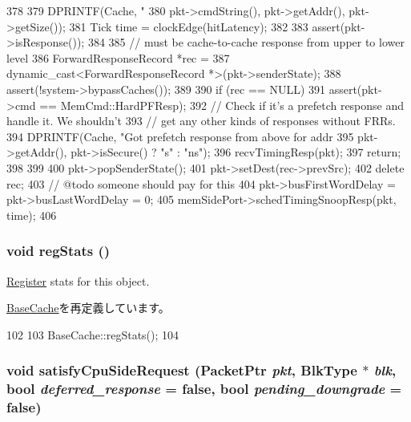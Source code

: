 \begin{DoxyCode}
378 {
379     DPRINTF(Cache, "%
380             pkt->cmdString(), pkt->getAddr(), pkt->getSize());
381     Tick time = clockEdge(hitLatency);
382 
383     assert(pkt->isResponse());
384 
385     // must be cache-to-cache response from upper to lower level
386     ForwardResponseRecord *rec =
387         dynamic_cast<ForwardResponseRecord *>(pkt->senderState);
388     assert(!system->bypassCaches());
389 
390     if (rec == NULL) {
391         assert(pkt->cmd == MemCmd::HardPFResp);
392         // Check if it's a prefetch response and handle it. We shouldn't
393         // get any other kinds of responses without FRRs.
394         DPRINTF(Cache, "Got prefetch response from above for addr %
395                 pkt->getAddr(), pkt->isSecure() ? "s" : "ns");
396         recvTimingResp(pkt);
397         return;
398     }
399 
400     pkt->popSenderState();
401     pkt->setDest(rec->prevSrc);
402     delete rec;
403     // @todo someone should pay for this
404     pkt->busFirstWordDelay = pkt->busLastWordDelay = 0;
405     memSidePort->schedTimingSnoopResp(pkt, time);
406 }
\end{DoxyCode}
\hypertarget{classCache_a4dc637449366fcdfc4e764cdf12d9b11}{
\subsubsection[{regStats}]{\setlength{\rightskip}{0pt plus 5cm}void regStats ()}}
\label{classCache_a4dc637449366fcdfc4e764cdf12d9b11}
\hyperlink{classRegister}{Register} stats for this object. 

\hyperlink{classBaseCache_a4dc637449366fcdfc4e764cdf12d9b11}{BaseCache}を再定義しています。


\begin{DoxyCode}
102 {
103     BaseCache::regStats();
104 }
\end{DoxyCode}
\hypertarget{classCache_a5d5d5944479d29a7bfc183f4b2b6a4fa}{
\subsubsection[{satisfyCpuSideRequest}]{\setlength{\rightskip}{0pt plus 5cm}void satisfyCpuSideRequest ({\bf PacketPtr} {\em pkt}, \/  {\bf BlkType} $\ast$ {\em blk}, \/  bool {\em deferred\_\-response} = {\ttfamily false}, \/  bool {\em pending\_\-downgrade} = {\ttfamily false})}}
\label{classCache_a5d5d5944479d29a7bfc183f4b2b6a4fa}



